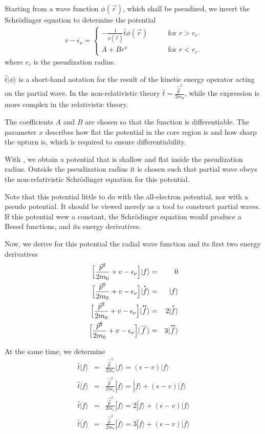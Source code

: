 \documentclass[11pt,a4paper]{report}
\begin{document}
Starting from a wave function $\phi(\vec{r})$, which shall be
pseudized, we invert the Schr\"odinger equation to determine the potential
\begin{eqnarray}
v-\epsilon_\nu=
\begin{cases}
-\frac{1}{\phi(\vec{r})}\hat{t}\phi(\vec{r})&\qquad\text{for $r>r_c$.}
\\
A+Br^x&\qquad\text{for $r<r_c$.}
\end{cases}
\label{eq:invertschrgl}
\end{eqnarray}
where $r_c$ is the pseudization radius. 

$\hat{t}|\phi\rangle$ is a short-hand notation for the
result of the kinetic energy operator acting on the partial wave. In
the non-relativistic theory $\hat{t}=\frac{\hat{\vec{p}}^2}{2m_0}$,
while the expression is more complex in the relativistic theory.

The coefficients $A$ and $B$
are chosen so that the function is differentiable. The parameter $x$
describes how flat the potential in the core region is and how sharp
the upturn is, which is required to ensure differentiability.

With , we obtain a potential that is shallow and
flat inside the pseudization radius. Outside the pseudization radius
it is chosen such that partial wave obeys the non-relativistic
Schr\"odinger equation for this potential.

Note that this potential little to do with the all-electron potential,
nor with a pseudo potential. It should be viewed merely as a tool to
construct partial waves. If this potential wew a constant, the
Schr\"odinger equation would produce a Bessel functions, and its
energy derivatives. 

Now, we derive for this potential the radial wave function and its
first two energy derivatives
\begin{eqnarray}
\Bigl[\frac{\vec{p}^2}{2m_0}+v-\epsilon_\nu\Bigr]|f\rangle&=&0
\nonumber\\
\Bigl[\frac{\vec{p}^2}{2m_0}+v-\epsilon_\nu\Bigr]|\dot{f}\rangle&=&|f\rangle
\nonumber\\
\Bigl[\frac{\vec{p}^2}{2m_0}+v-\epsilon_\nu\Bigr]|\ddot{f}\rangle
&=&2|\dot{f}\rangle
\nonumber\\
\Bigl[\frac{\vec{p}^2}{2m_0}+v-\epsilon_\nu\Bigr]|\dddot{f}\rangle
&=&3|\ddot{f}\rangle
\end{eqnarray}

At the same time, we determine 
\begin{eqnarray}
\hat{t}|f\rangle&=&\frac{\hat{\vec{p}}^2}{2m_e}|f\rangle
=(\epsilon-v)|f\rangle
\nonumber\\
\hat{t}|\dot{f}\rangle&=&\frac{\hat{\vec{p}}^2}{2m_e}|\dot{f}\rangle
=|f\rangle+(\epsilon-v)|\dot{f}\rangle
\nonumber\\
\hat{t}|\ddot{f}\rangle&=&\frac{\hat{\vec{p}}^2}{2m_e}|\ddot{f}\rangle
=2|\dot{f}\rangle+(\epsilon-v)|\ddot{f}\rangle
\nonumber\\
\hat{t}|\dddot{f}\rangle&=&\frac{\hat{\vec{p}}^2}{2m_e}|\dddot{f}\rangle
=3|\ddot{f}\rangle+(\epsilon-v)|\dddot{f}\rangle
\end{eqnarray}
\end{document}
